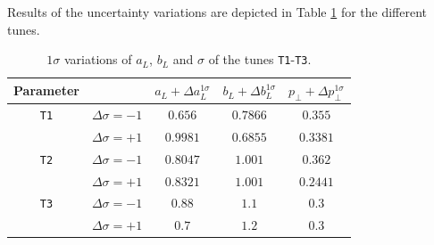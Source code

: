 \documentclass[aps,preprint,floatfix,nofootinbib,showpacs]{revtex4-1}
\begin{document}
Results of the uncertainty variations are depicted in Table \ref{Table.variations1}
for the different tunes.


\begin{table}[!h]
 \begin{center}
 \begin{tabular}{ c | c | c | c | c  }
 \hline \hline
  Parameter   & & \hspace{0.4cm} $a_L + \Delta a_L^{1\sigma}$ \hspace{0.4cm}   & \hspace{0.4cm} $b_L + \Delta b_L^{1\sigma}$ \hspace{0.4cm} & \hspace{0.4cm} $p_\perp + \Delta p_\perp^{1\sigma}$ \hspace{0.4cm} \\ \hline \hline
  \texttt{T1} & $\Delta\sigma=-1$ \hspace{0.5cm}  & $0.656$   & $0.7866$  & $0.355$ \\ 
              & $\Delta\sigma=+1$ \hspace{0.5cm}  & $0.9981$  & $0.6855$ & $0.3381$ \\ \hline \hline
  \texttt{T2} & $\Delta\sigma=-1$ \hspace{0.5cm}  & $0.8047$  & $1.001$ & $0.362$ \\ 
              & $\Delta\sigma=+1$ \hspace{0.5cm}  & $0.8321$   & $1.001$ & $0.2441$ \\ \hline \hline
  \texttt{T3} & $\Delta\sigma=-1$ \hspace{0.5cm}  &  $0.88$   &  $1.1$   &  $0.3$  \\
              & $\Delta\sigma=+1$ \hspace{0.5cm}  &  $0.7$    &  $1.2$   &   $0.3$  \\ \hline \hline
 \end{tabular}
 \end{center}
 \caption{$1\sigma$ variations of $a_L$, $b_L$ and $\sigma$ of the tunes \texttt{T1}-\texttt{T3}.}
 \label{Table.variations1}
\end{table}
\end{document}
